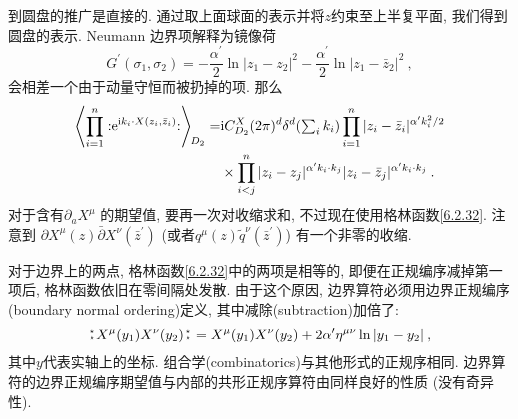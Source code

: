 到圆盘的推广是直接的. 通过取上面球面的表示并将$z$约束至上半复平面, 我们得到圆盘的表示. Neumann 边界项解释为镜像荷
\begin{equation}
	G^{\prime}(\sigma_{1}, \sigma_{2})=-\frac{\alpha^{\prime}}{2} \ln |z_{1}-z_{2}|^{2}
	-\frac{\alpha^{\prime}}{2} \ln |z_{1}-\bar{z}_{2}|^{2} \:, \label{6.2.32}
\end{equation}
会相差一个由于动量守恒而被扔掉的项. 那么
	\begin{align}
		\left\langle\prod_{i=1}^{n}: \mathrel{\mathrm{e}^{\mathrm{i} k_{i} \cdot X(z_{i}, \bar{z}_{i})}}:\right\rangle \bigg._{\!\!D_{2}} 
		=& \mathrm{i} C_{D_{2}}^{X} (2 \pi)^{d} \delta^{d}({\textstyle\sum_{i} k_{i}}) 
		\prod_{i=1}^{n}|z_{i}-\bar{z}_{i}|^{\alpha^{\prime} k_{i}^{2} / 2}  \nonumber \\
		& \times \prod_{ i<j}^{n} |z_{i}-z_{j}|^{\alpha^{\prime} k_{i} \cdot k_{j} }
		|z_{i}-\bar{z}_{j}|^{\alpha^{\prime} k_{i} \cdot k_{j}} \:. \label{6.2.33}
	\end{align}
对于含有$\partial_{a} X^{\mu}$ 的期望值, 要再一次对收缩求和, 不过现在使用格林函数\eqref{6.2.32}. 
注意到 $\partial X^{\mu}(z) \bar{\partial} X^{\nu}(\bar{z}^{\prime})$ (或者$ q^{\mu}(z) \tilde{q}^{\nu}(\bar{z}^{\prime})$) 有一个非零的收缩.

对于边界上的两点, 格林函数\eqref{6.2.32}中的两项是相等的, 即便在正规编序减掉第一项后, 格林函数依旧在零间隔处发散. 
由于这个原因, 边界算符必须用边界正规编序(boundary normal ordering)定义, 其中减除(subtraction)加倍了:
\begin{equation}
	 \bno X^{\mu}(y_{1}) X^{\nu}(y_{2})\bno = X^{\mu}(y_{1}) X^{\nu}(y_{2})+2 \alpha^{\prime} \eta^{\mu \nu} 
	 \ln |y_{1}-y_{2}| \:,  \label{6.2.34}
\end{equation}
其中$y$代表实轴上的坐标. 组合学(combinatorics)与其他形式的正规序相同. 边界算符的边界正规编序期望值与内部的共形正规序算符由同样良好的性质 (没有奇异性).

